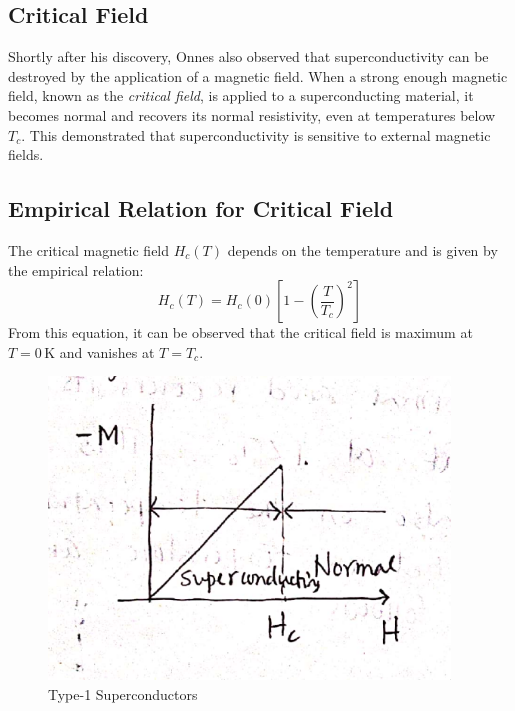 \documentclass{article}
\begin{document}
\subsection{Critical Field}

Shortly after his discovery, Onnes also observed that superconductivity can be destroyed by the application of a magnetic field. When a strong enough magnetic field, known as the \emph{critical field}, is applied to a superconducting material, it becomes normal and recovers its normal resistivity, even at temperatures below \(T_c\). This demonstrated that superconductivity is sensitive to external magnetic fields.

\subsection{Empirical Relation for Critical Field}

The critical magnetic field \(H_c(T)\) depends on the temperature and is given by the empirical relation:
\[
H_c(T) = H_c(0) \left[ 1 - \left( \frac{T}{T_c} \right)^2 \right]
\]
From this equation, it can be observed that the critical field is maximum at \(T = 0 \, \text{K}\) and vanishes at \(T = T_c\).

\begin{figure}
    \begin{center}
        \includegraphics[width=0.95\textwidth]{figures/3.png}
    \end{center}
    \caption{Type-1 Superconductors}\label{fig:}
\end{figure}
\end{document}
